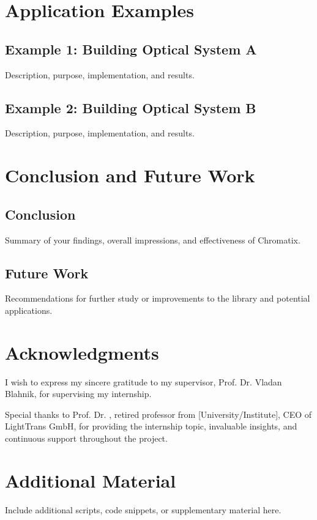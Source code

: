 \documentclass[a4paper,12pt]{report}
\begin{document}
\chapter{Application Examples}
\section{Example 1: Building Optical System A}
Description, purpose, implementation, and results.

\section{Example 2: Building Optical System B}
Description, purpose, implementation, and results.

\chapter{Conclusion and Future Work}
\section{Conclusion}
Summary of your findings, overall impressions, and effectiveness of Chromatix.

\section{Future Work}
Recommendations for further study or improvements to the library and potential applications.

\chapter{Acknowledgments}
I wish to express my sincere gratitude to my supervisor, Prof. Dr. Vladan Blahnik, for supervising my internship. 

Special thanks to Prof. Dr. , retired professor from [University/Institute], CEO of LightTrans GmbH, for providing the internship topic, invaluable insights, and continuous support throughout the project. 






\appendix
\chapter{Additional Material}
Include additional scripts, code snippets, or supplementary material here.
\end{document}
